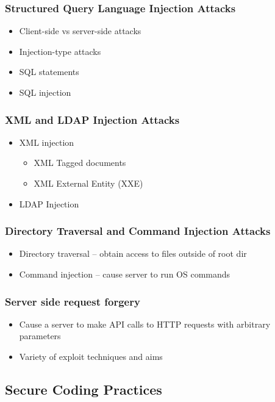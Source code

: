 		\subsubsection {Structured Query Language Injection Attacks}
			\begin{itemize}
				\item Client-side vs server-side attacks
				\item Injection-type attacks
				\item SQL statements
				\item SQL injection
			\end{itemize}
		\subsubsection {XML and LDAP Injection Attacks}
			\begin{itemize}
				\item XML injection
					\begin{itemize}
						\item XML Tagged documents
						\item XML External Entity (XXE)
					\end{itemize}
				\item LDAP Injection
			\end{itemize}
		\subsubsection {Directory Traversal and Command Injection Attacks}
			\begin{itemize}
				\item Directory traversal -- obtain access to files outside of root dir
				\item Command injection -- cause server to run OS commands
			\end{itemize}
		\subsubsection {Server side request forgery}
			\begin{itemize}
				\item Cause a server to make API calls to HTTP requests with arbitrary
					parameters
				\item Variety of exploit techniques and aims
			\end{itemize}
	\subsection {Secure Coding Practices}
